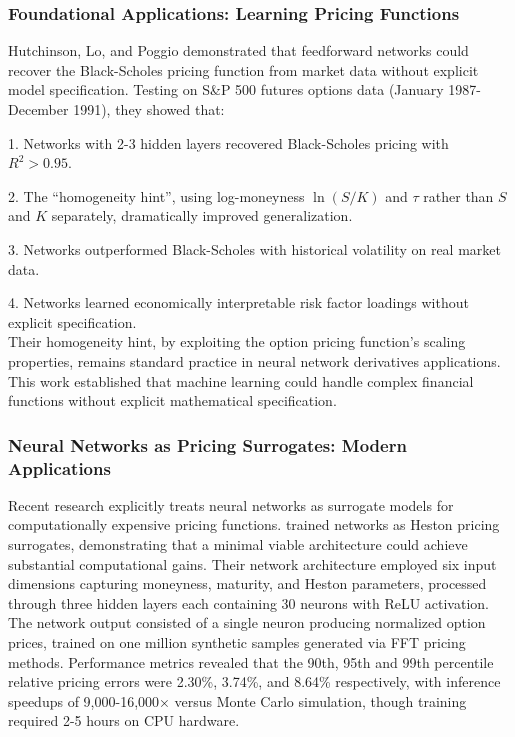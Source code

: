 \documentclass[12pt,a4paper]{article}
\begin{document}
\subsubsection{Foundational Applications: Learning Pricing Functions}

Hutchinson, Lo, and Poggio \cite{HutchinsonLoPogg1994} demonstrated that feedforward networks could recover the Black-Scholes pricing function from market data without explicit model specification. Testing on S\&P 500 futures options data (January 1987-December 1991), they showed that:

1. Networks with 2-3 hidden layers recovered Black-Scholes pricing with $R^2 > 0.95$.

2. The ``homogeneity hint'', using log-moneyness $\ln(S/K)$ and $\tau$ rather than $S$ and $K$ separately, dramatically improved generalization.

3. Networks outperformed Black-Scholes with historical volatility on real market data.

4. Networks learned economically interpretable risk factor loadings without explicit specification.\\[0.05cm]

Their homogeneity hint, by exploiting the option pricing function's scaling properties, remains standard practice in neural network derivatives applications. This work established that machine learning could handle complex financial functions without explicit mathematical specification.

\subsubsection{Neural Networks as Pricing Surrogates: Modern Applications}

Recent research explicitly treats neural networks as surrogate models for computationally expensive pricing functions. \cite{HorvathMuguruzaTomas2019} trained networks as Heston pricing surrogates, demonstrating that a minimal viable architecture could achieve substantial computational gains. Their network architecture employed six input dimensions capturing moneyness, maturity, and Heston parameters, processed through three hidden layers each containing 30 neurons with ReLU activation. The network output consisted of a single neuron producing normalized option prices, trained on one million synthetic samples generated via FFT pricing methods. Performance metrics revealed that the 90th, 95th and 99th percentile relative pricing errors were 2.30\%, 3.74\%, and 8.64\% respectively, with inference speedups of 9,000-16,000× versus Monte Carlo simulation, though training required 2-5 hours on CPU hardware.\\[0.05cm]
\end{document}

